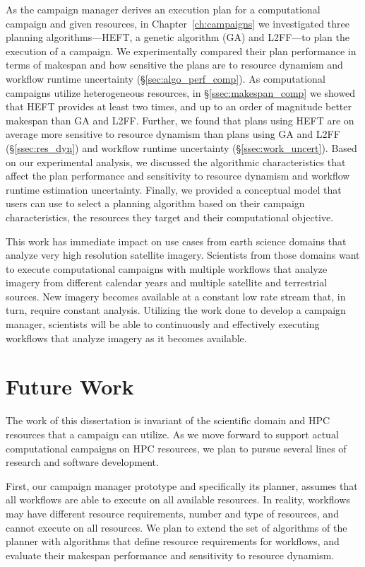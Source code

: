 As the campaign manager derives an execution plan for a computational campaign
and given resources, in Chapter~\ref{ch:campaigns} we investigated three
planning algorithms---HEFT, a genetic algorithm (GA) and L2FF---to plan the
execution of a campaign. We experimentally compared their plan performance in
terms of makespan and how sensitive the plans are to resource dynamism and
workflow runtime uncertainty (\S\ref{sec:algo_perf_comp}). As computational
campaigns utilize heterogeneous resources, in \S\ref{ssec:makespan_comp} we
showed that HEFT provides at least two times, and up to an order of magnitude
better makespan than GA and L2FF. Further, we found that plans using HEFT are on average 
more sensitive to resource dynamism than plans using GA and L2FF
(\S\ref{ssec:res_dyn}) and workflow runtime uncertainty
(\S\ref{ssec:work_uncert}). Based on our experimental analysis, we discussed
the algorithmic characteristics that affect the plan performance and
sensitivity to resource dynamism and workflow runtime estimation uncertainty.
Finally, we provided a conceptual model that users can use to select a
planning algorithm based on their campaign characteristics, the resources they
target and their computational objective.

This work has immediate impact on use cases from earth science domains that
analyze very high resolution satellite imagery. Scientists from those domains
want to execute computational campaigns with multiple workflows that analyze
imagery from different calendar years and multiple satellite and terrestrial
sources. New imagery becomes available at a constant low rate stream that, in
turn, require constant analysis. Utilizing the work done to develop a campaign
manager, scientists will be able to continuously and effectively executing
workflows that analyze imagery as it becomes available.

\section{Future Work}

The work of this dissertation is invariant of the scientific domain and HPC
resources that a campaign can utilize. As we move forward to support actual
computational campaigns on HPC resources, we plan to pursue several lines of
research and software development.

First, our campaign manager prototype and specifically its planner, assumes that
all workflows are able to execute on all available resources. In reality,
workflows may have different resource requirements, number and type of
resources, and cannot execute on all resources. We plan to extend the set of
algorithms of the planner with algorithms that define resource requirements for
workflows, and evaluate their makespan performance and sensitivity to resource
dynamism.

